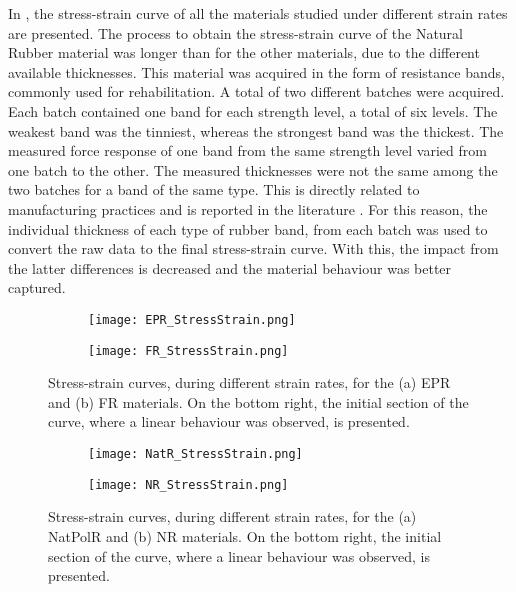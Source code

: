 In , the stress-strain curve of all the materials studied under different strain rates are presented. The process to obtain the stress-strain curve of the Natural Rubber material was longer than for the other materials, due to the different available thicknesses. This material was acquired in the form of resistance bands, commonly used for rehabilitation. A total of two different batches were acquired. Each batch contained one band for each strength level, a total of six levels. The weakest band was the tinniest, whereas the strongest band was the thickest. The measured force response of one band from the same strength level varied from one batch to the other. The measured thicknesses were not the same among the two batches for a band of the same type. This is directly related to manufacturing practices and is reported in the literature \cite{case2015soft}. For this reason, the individual thickness of each type of rubber band, from each batch was used to convert the raw data to the final stress-strain curve. With this, the impact from the latter differences is decreased and the material behaviour was better captured.
\newpage
\begin{figure}[H]
\vspace{-2em}
    \centering
        \begin{subfigure}[b]{0.93\textwidth}
        \centering
        \texttt{[image: EPR\_StressStrain.png]}
        \caption{}
        \label{sfig:EPRSS}
    \end{subfigure}
    \begin{subfigure}[b]{0.93\textwidth}
        \centering
        \texttt{[image: FR\_StressStrain.png]}
        \caption{}
        \label{sfig:FRSS}
    \end{subfigure}
    \caption{Stress-strain curves, during different strain rates, for the (a) EPR and (b) FR materials. On the bottom right, the initial section of the curve, where a linear behaviour was observed, is presented.}
    \label{fig:EPR-FRSS}
\end{figure}
\newpage
\begin{figure}[H]
    \vspace{-2em}
    \centering
    \begin{subfigure}[b]{0.93\textwidth}
    \centering
    \texttt{[image: NatR\_StressStrain.png]}
    \caption{}
    \label{sfig:NatRSS}
    \end{subfigure}

    \begin{subfigure}[b]{0.93\textwidth}
    \centering
    \texttt{[image: NR\_StressStrain.png]}
    \caption{}
    \label{sfig:NRSS}
    \end{subfigure}
    \caption{Stress-strain curves, during different strain rates, for the (a) NatPolR and (b) NR materials. On the bottom right, the initial section of the curve, where a linear behaviour was observed, is presented.}
    \label{fig:NatR-NRSS}
\end{figure}
